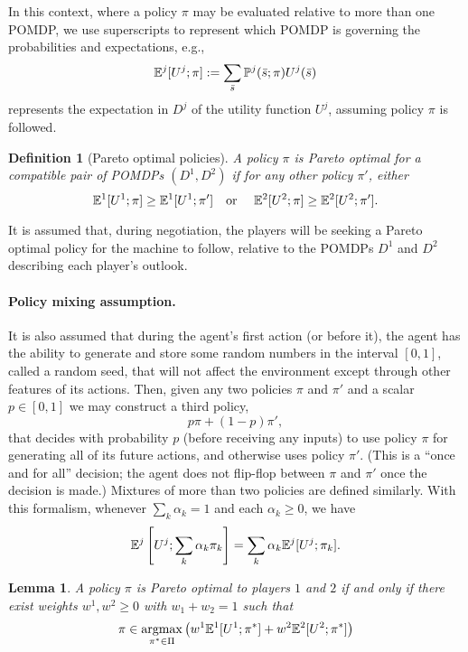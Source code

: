\documentclass{article}  %
\newcommand{\seq}{\bar}
\DeclareMathOperator*{\argmax}{argmax}
\newtheorem{lemma}[theorem]{Lemma}
\newtheorem{definition}[theorem]{Definition}
\begin{document}
In this context, where a policy $\pi$ may be evaluated relative to more than one POMDP, we use superscripts to represent which POMDP is governing the probabilities and expectations, e.g.,
\[
\EE^j[U^j; \pi] := \sum_{\seq s} \PP^j(\bar s; \pi) U^j(\bar s)
\]
represents the expectation in $D^j$ of the utility function $U^j$, assuming policy $\pi$ is followed.
\begin{definition}[Pareto optimal policies]  A policy $\pi$ is \emph{Pareto optimal} for a compatible pair of POMDPs $(D^1,D^2)$ if for any other policy $\pi'$, either
\[
\mathbb{E}^1[U^1;\pi] \ge \mathbb{E}^1[U^1;\pi'] \textrm{\quad or \quad} \mathbb{E}^2[U^2;\pi] \ge \mathbb{E}^2[U^2;\pi'].
\]
\end{definition}
%
It is assumed that, during negotiation, the players will be seeking a Pareto optimal policy for the machine to follow, relative to the POMDPs $D^1$ and $D^2$ describing each player's outlook.

\paragraph{Policy mixing assumption.}  It is also assumed that during the agent's first action (or before it), the agent has the ability to generate and store some random numbers in the interval $[0,1]$, called a random seed, that will not affect the environment except through other features of its actions.  Then, given any two policies $\pi$ and $\pi'$ and a scalar $p\in[0,1]$ we may construct a third policy, 
\[
p\pi + (1-p)\pi',
\]
 that decides with probability $p$ (before receiving any inputs) to use policy $\pi$ for generating all of its future actions, and otherwise uses policy $\pi'$.  (This is a ``once and for all'' decision; the agent does not flip-flop between $\pi$ and $\pi'$ once the decision is made.)  Mixtures of more than two policies are defined similarly.  With this formalism, whenever $\sum_k \alpha_k = 1$ and each $\alpha_k\ge 0$, we have
\begin{equation}\label{eqn:linearity}
\mathbb{E}^j\left[U^j ; \sum_k \alpha_k \pi_k\right] = \sum_k \alpha_k \mathbb{E}^j[U^j ; \pi_k].
\end{equation}

\begin{lemma}\label{lem:pareto}
A policy $\pi$ is Pareto optimal to players $1$ and $2$ if and only if there exist weights $w^1,w^2\geq 0$ with $w_1+w_2=1$ such that
\begin{equation}\label{eqn:pareto}
\pi \in \argmax_{\pi^* \in\Pi}\left(w^1\EE^1[U^1;\pi^*] + w^2\EE^2[U^2; \pi^*]\right)
\end{equation}
\end{lemma}
\end{document}
